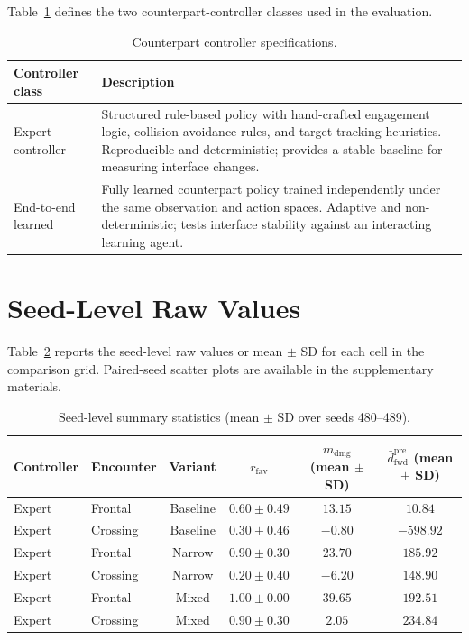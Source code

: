 \documentclass[drones,article,submit,pdftex,moreauthors]{Definitions/mdpi}
\begin{document}
Table~\ref{tab:counterpart_specs} defines the two counterpart-controller classes used in the evaluation.
\begin{table}[H]
\centering
\caption{Counterpart controller specifications.}
\label{tab:counterpart_specs}
\begin{tabular}{@{}p{3cm}p{10cm}@{}}
\toprule
Controller class & Description \\
\midrule
Expert controller & Structured rule-based policy with hand-crafted engagement logic, collision-avoidance rules, and target-tracking heuristics. Reproducible and deterministic; provides a stable baseline for measuring interface changes. \\
End-to-end learned & Fully learned counterpart policy trained independently under the same observation and action spaces. Adaptive and non-deterministic; tests interface stability against an interacting learning agent. \\
\bottomrule
\end{tabular}
\end{table}


\section{Seed-Level Raw Values}

Table~\ref{tab:seed_level} reports the seed-level raw values or mean $\pm$ SD for each cell in the comparison grid. Paired-seed scatter plots are available in the supplementary materials.
\begin{table}[H]
\centering
\caption{Seed-level summary statistics (mean $\pm$ SD over seeds 480--489).}
\label{tab:seed_level}
\begin{tabular}{@{}llcccc@{}}
\toprule
Controller & Encounter & Variant & $r_{\mathrm{fav}}$ & $m_{\mathrm{dmg}}$ (mean $\pm$ SD) & $\bar{d}_{\mathrm{fwd}}^{\mathrm{pre}}$ (mean $\pm$ SD) \\
\midrule
Expert & Frontal & Baseline & $0.60 \pm 0.49$ & $13.15$ & $10.84$ \\
Expert & Crossing & Baseline & $0.30 \pm 0.46$ & $-0.80$ & $-598.92$ \\
Expert & Frontal & Narrow & $0.90 \pm 0.30$ & $23.70$ & $185.92$ \\
Expert & Crossing & Narrow & $0.20 \pm 0.40$ & $-6.20$ & $148.90$ \\
Expert & Frontal & Mixed & $1.00 \pm 0.00$ & $39.65$ & $192.51$ \\
Expert & Crossing & Mixed & $0.90 \pm 0.30$ & $2.05$ & $234.84$ \\
\bottomrule
\end{tabular}
\end{table}
\end{document}
